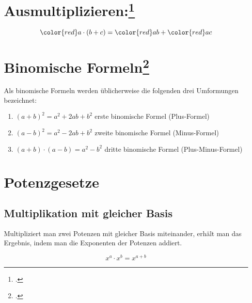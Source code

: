 \documentclass{lehramt-informatik-haupt}
\begin{document}
\section{Ausmultiplizieren:\footcite[/ausmultiplizieren]{net:html:mathebibel}}

\begin{displaymath}
{\color{red}a} \cdot (b + c) = {\color{red}a}b + {\color{red}a}c
\end{displaymath}

%

\section{Binomische Formeln\footcite{wiki:binomische-formeln}}

Als binomische Formeln werden üblicherweise die folgenden drei
Umformungen bezeichnet:

\begin{enumerate}
\item $(a + b)^2 = a^2 + 2ab + b^2$
erste binomische Formel (Plus-Formel)

\item $(a - b)^2 = a^2 - 2ab + b^2$
zweite binomische Formel (Minus-Formel)

\item $(a + b) \cdot (a - b) = a^2 - b^2$
dritte binomische Formel (Plus-Minus-Formel)
\end{enumerate}

%

\section{Potenzgesetze}

%

\subsection{Multiplikation mit gleicher Basis}

Multipliziert man zwei Potenzen mit gleicher Basis miteinander, erhält
man das Ergebnis, indem man die Exponenten der Potenzen addiert.

\begin{displaymath}
x^a \cdot x^b = x^{a+b}
\end{displaymath}
\end{document}
